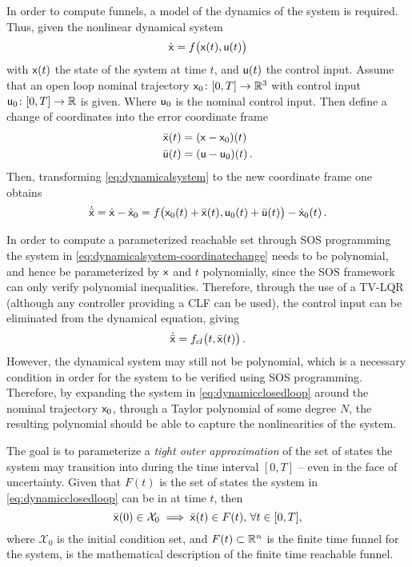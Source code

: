 In order to compute funnels, a model of the dynamics of the system is required.
Thus, given the nonlinear dynamical system
\begin{equation}
  \dot{{\mathbf{\mathsf{x}}}} = f\big({\mathbf{\mathsf{x}}}(t), {\mathbf{\mathsf{u}}}(t) \big)
\end{equation}
with \({\mathbf{\mathsf{x}}}(t)\) the state of the system at time \(t\), and \({\mathbf{\mathsf{u}}}(t)\)
the control input. Assume that an open loop nominal trajectory \({\mathbf{\mathsf{x}}}_0
\colon [0,T] \rightarrow \mathbb{R}^3\) with control input \({\mathbf{\mathsf{u}}}_0 \colon [0,T]
\rightarrow \mathbb{R}\) is given. Where \({\mathbf{\mathsf{u}}}_{0}\) is the nominal control
input. Then define a change of coordinates into the error coordinate frame
\begin{align}
  \label{eq:system-error-dynamics}
  \bar{{\mathbf{\mathsf{x}}}}(t) &= ( {\mathbf{\mathsf{x}}} - {\mathbf{\mathsf{x}}}_0 )(t) \\
  \bar{{\mathbf{\mathsf{u}}}}(t) &= ({\mathbf{\mathsf{u}}} - {\mathbf{\mathsf{u}}}_0 )(t) \, .
\end{align}
Then, transforming \cref{eq:dynamicalsystem} to the new coordinate frame one
obtains
\begin{equation}
  \dot{\bar{{\mathbf{\mathsf{x}}}}} = \dot{{\mathbf{\mathsf{x}}}} - \dot{{\mathbf{\mathsf{x}}}}_0 = f\big( {\mathbf{\mathsf{x}}}_0(t) + \bar{{\mathbf{\mathsf{x}}}}(t), {\mathbf{\mathsf{u}}}_0(t) + \bar{{\mathbf{\mathsf{u}}}}(t) \big) - \dot{{\mathbf{\mathsf{x}}}}_0(t) \, . \label{eq:dynamicalsystem-coordinatechange}
\end{equation}

In order to compute a parameterized reachable set through \ac{SOS} programming
the system in \cref{eq:dynamicalsystem-coordinatechange} needs to be polynomial,
and hence be parameterized by \({\mathbf{\mathsf{x}}}\) and \(t\) polynomially, since the
\ac{SOS} framework can only verify polynomial inequalities. Therefore, through
the use of a \ac{TV-LQR} (although any controller providing a \ac{CLF} can be
used), the control input can be eliminated from the dynamical equation, giving
\begin{equation}
  \label{eq:dynamicclosedloop}
  \dot{\bar{{\mathbf{\mathsf{x}}}}} = f_{cl}\big( t,\bar{{\mathbf{\mathsf{x}}}}(t) \big) \, .
\end{equation}
However, the dynamical system may still not be polynomial, which is a necessary
condition in order for the system to be verified using \ac{SOS} programming.
Therefore, by expanding the system in \cref{eq:dynamicclosedloop} around the
nominal trajectory \({\mathbf{\mathsf{x}}}_0\), through a Taylor polynomial of some degree
\(N\), the resulting polynomial should be able to capture the nonlinearities of
the system.

The goal is to parameterize a \textit{tight outer approximation} of the set of
states the system may transition into during the time interval \([0,T]\) -- even
in the face of uncertainty. Given that \(F(t)\) is the set of states the
system in \cref{eq:dynamicclosedloop} can be in at time \(t\), then
\begin{equation}
  \label{eq:reachableset}
  \bar{{\mathbf{\mathsf{x}}}}(0) \in \mathcal{X}_0 \implies \bar{{\mathbf{\mathsf{x}}}}(t) \in F(t), \, \forall t \in [0,T],
\end{equation}
where \(\mathcal{X}_0\) is the initial condition set, and \(F(t) \subset \mathbb{R}^n\)
is the finite time funnel for the system, is the mathematical description of the
finite time reachable funnel.

